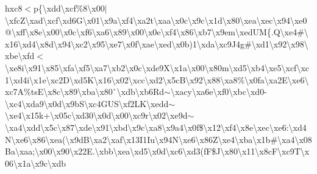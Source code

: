 \begin{DoxyCompactItemize}
h{}xc8$<$p\{\textbackslash{}xdd\textbackslash{}xcf\%8\textbackslash{}x00$\vert$\textbackslash{}xfc\+Z\textbackslash{}xad\textbackslash{}xcf\textbackslash{}xd6\+G\textbackslash{}x01\textbackslash{}x9a\textbackslash{}xf4\textbackslash{}xa2t\textbackslash{}xaa\textbackslash{}x0c\textbackslash{}x9c\textbackslash{}x1d\textbackslash{}x80\textbackslash{}xea\textbackslash{}xec\textbackslash{}x94\textbackslash{}xe0@\textbackslash{}xff\textbackslash{}x8e\textbackslash{}x00\textbackslash{}x0c\textbackslash{}xf6\textbackslash{}xa6\textbackslash{}x89\textbackslash{}x00\textbackslash{}x0e\textbackslash{}xf4\textbackslash{}x86\textbackslash{}xb7\textbackslash{}x9em\textbackslash{}xed\+U\+M\{.\+Q\textbackslash{}xe4\#\textbackslash{}x16\textbackslash{}xd4\textbackslash{}x8d\textbackslash{}x94\textbackslash{}xc2\textbackslash{}x95\textbackslash{}xe7\textbackslash{}x0f\textbackslash{}xae\textbackslash{}xed\textbackslash{}x0b)1\textbackslash{}xda\textbackslash{}xc9\+J4g\#\textbackslash{}xd1\textbackslash{}x92\textbackslash{}x98\textbackslash{}xbe\textbackslash{}xfd$<$\textbackslash{}xe8i\textbackslash{}x91\textbackslash{}x85\textbackslash{}xfa\textbackslash{}xf5\textbackslash{}xa7\textbackslash{}xb2\textbackslash{}x0c\textbackslash{}xde9\+X\textbackslash{}x1a\textbackslash{}x00\textbackslash{}x80m\textbackslash{}xd5\textbackslash{}xb4\textbackslash{}xe5\textbackslash{}xcf\textbackslash{}xc1\textbackslash{}xd4i\textbackslash{}x1e\textbackslash{}xc2\+D\textbackslash{}xd5\+K\textbackslash{}x16\textbackslash{}x02\textbackslash{}xcc\textbackslash{}xd2\textbackslash{}x5c\+B\textbackslash{}x92\textbackslash{}x88\textbackslash{}xa8\%\textbackslash{}x0fa\textbackslash{}xa2\+E\textbackslash{}xe6\textbackslash{}xc7\+A\%ts\+E\textbackslash{}x8c\textbackslash{}x89\textbackslash{}xba\textbackslash{}x80\`{}\textbackslash{}xdb\textbackslash{}xb6\+Rd$\sim$\textbackslash{}xacy\textbackslash{}xa6e\textbackslash{}xf0\textbackslash{}xbc\textbackslash{}xd0-\/\textbackslash{}xc4\textbackslash{}xda9\textbackslash{}x0d\textbackslash{}x9b\+S\textbackslash{}xc4\+G\+U\+S\textbackslash{}xf2\+L\+K\textbackslash{}xedd$\sim$\textbackslash{}xe4\textbackslash{}x15k+\textbackslash{}x05c\textbackslash{}xd30\textbackslash{}x0d\textbackslash{}x00\textbackslash{}xc9r\textbackslash{}x02\textbackslash{}xe9d$\sim$\textbackslash{}xa4\textbackslash{}xdd\textbackslash{}x5c\textbackslash{}x87\textbackslash{}xde\textbackslash{}x91\textbackslash{}xbd\textbackslash{}x9c\textbackslash{}xa8\textbackslash{}x9a4\textbackslash{}x0f\$\textbackslash{}x12\textbackslash{}xf4\textbackslash{}x8e\textbackslash{}xec\textbackslash{}xe6\+:\textbackslash{}xd4\+N\textbackslash{}xe6\textbackslash{}x86\textbackslash{}xea(\textbackslash{}x9d\+B\textbackslash{}xa2\textbackslash{}xaf\textbackslash{}x13\+I1\+Iu\textbackslash{}x94\+N\textbackslash{}xe6\textbackslash{}x86\+Z\textbackslash{}xe4\textbackslash{}xba\textbackslash{}x1b\#\textbackslash{}xa4\textbackslash{}x08\+Ba\textbackslash{}xaa;\textbackslash{}x00\textbackslash{}x90\textbackslash{}x22\+E.\textbackslash{}xbb\textbackslash{}xea\textbackslash{}xd5\textbackslash{}x0d\textbackslash{}xc6\textbackslash{}xd3(f\+F\$\+J\textbackslash{}x80\textbackslash{}x11\textbackslash{}x8c\+F\textbackslash{}xc9\+T\textbackslash{}x06\textbackslash{}x1a\textbackslash{}x9c\textbackslash{}xdb\textbacksla
\end{DoxyCompactItemize}

